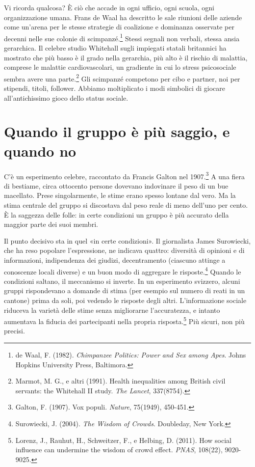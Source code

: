 Vi ricorda qualcosa? È ciò che accade in ogni ufficio, ogni scuola, ogni organizzazione umana. Frans de Waal ha descritto le sale riunioni delle aziende come un'arena per le stesse strategie di coalizione e dominanza osservate per decenni nelle sue colonie di scimpanzé.\footnote{de Waal, F. (1982). \textit{Chimpanzee Politics: Power and Sex among Apes}. Johns Hopkins University Press, Baltimora.} Stessi segnali non verbali, stessa ansia gerarchica. Il celebre studio Whitehall sugli impiegati statali britannici ha mostrato che più basso è il grado nella gerarchia, più alto è il rischio di malattia, comprese le malattie cardiovascolari, un gradiente in cui lo stress psicosociale sembra avere una parte.\footnote{Marmot, M. G., e altri (1991). Health inequalities among British civil servants: the Whitehall II study. \textit{The Lancet}, 337(8754).} Gli scimpanzé competono per cibo e partner, noi per stipendi, titoli, follower. Abbiamo moltiplicato i modi simbolici di giocare all'antichissimo gioco dello status sociale.

\section{Quando il gruppo è più saggio, e quando no}
\label{sec:p1c9-saggezza-folle}

C'è un esperimento celebre, raccontato da Francis Galton nel 1907.\footnote{Galton, F. (1907). Vox populi. \textit{Nature}, 75(1949), 450-451.} A una fiera di bestiame, circa ottocento persone dovevano indovinare il peso di un bue macellato. Prese singolarmente, le stime erano spesso lontane dal vero. Ma la stima centrale del gruppo si discostava dal peso reale di meno dell'uno per cento. È la saggezza delle folle: in certe condizioni un gruppo è più accurato della maggior parte dei suoi membri.

Il punto decisivo sta in quel «in certe condizioni». Il giornalista James Surowiecki, che ha reso popolare l'espressione, ne indicava quattro: diversità di opinioni e di informazioni, indipendenza dei giudizi, decentramento (ciascuno attinge a conoscenze locali diverse) e un buon modo di aggregare le risposte.\footnote{Surowiecki, J. (2004). \textit{The Wisdom of Crowds}. Doubleday, New York.} Quando le condizioni saltano, il meccanismo si inverte. In un esperimento svizzero, alcuni gruppi rispondevano a domande di stima (per esempio sul numero di reati in un cantone) prima da soli, poi vedendo le risposte degli altri. L'informazione sociale riduceva la varietà delle stime senza migliorarne l'accuratezza, e intanto aumentava la fiducia dei partecipanti nella propria risposta.\footnote{Lorenz, J., Rauhut, H., Schweitzer, F., e Helbing, D. (2011). How social influence can undermine the wisdom of crowd effect. \textit{PNAS}, 108(22), 9020-9025.} Più sicuri, non più precisi.

